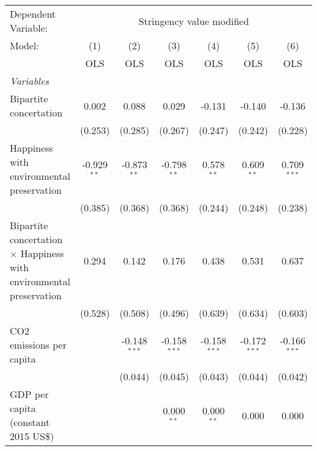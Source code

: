 
\begingroup
\centering
\begin{tabular}{lcccccc}
   \toprule
   Dependent Variable: & \multicolumn{6}{c}{Stringency value modified}\\
   Model:                                                                     & (1)           & (2)            & (3)            & (4)            & (5)            & (6)\\  
                                                                              &  OLS          & OLS            & OLS            & OLS            & OLS            & OLS\\  
   \midrule
   \emph{Variables}\\
   Bipartite concertation                                                     & 0.002         & 0.088          & 0.029          & -0.131         & -0.140         & -0.136\\   
                                                                              & (0.253)       & (0.285)        & (0.267)        & (0.247)        & (0.242)        & (0.228)\\   
   Happiness with environmental preservation                                  & -0.929$^{**}$ & -0.873$^{**}$  & -0.798$^{**}$  & 0.578$^{**}$   & 0.609$^{**}$   & 0.709$^{***}$\\   
                                                                              & (0.385)       & (0.368)        & (0.368)        & (0.244)        & (0.248)        & (0.238)\\   
   Bipartite concertation $\times$ Happiness with environmental preservation  & 0.294         & 0.142          & 0.176          & 0.438          & 0.531          & 0.637\\   
                                                                              & (0.528)       & (0.508)        & (0.496)        & (0.639)        & (0.634)        & (0.603)\\   
   CO2 emissions per capita                                                   &               & -0.148$^{***}$ & -0.158$^{***}$ & -0.158$^{***}$ & -0.172$^{***}$ & -0.166$^{***}$\\   
                                                                              &               & (0.044)        & (0.045)        & (0.043)        & (0.044)        & (0.042)\\   
   GDP per capita (constant 2015 US\$)                                        &               &                & 0.000$^{**}$   & 0.000$^{**}$   & 0.000          & 0.000\\   

\end{tabular}
